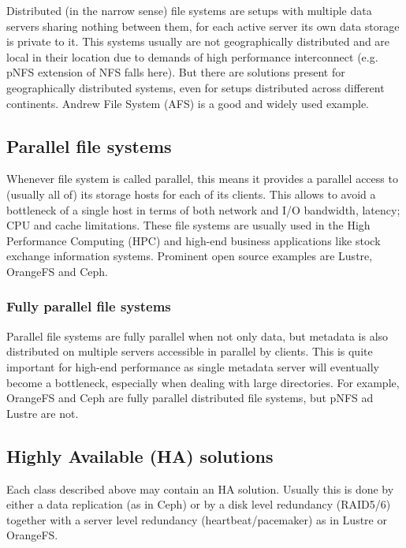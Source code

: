 \documentclass[10pt, a5paper]{article}
\begin{document}
Distributed (in the narrow sense) file systems are setups with multiple data servers sharing nothing between them, for each active server its own data storage is private to it. This systems usually are not geographically distributed and are local in their location due to demands of high performance interconnect (e.g. pNFS\cite{bib3} extension of NFS\cite{bib2} falls here). But there are solutions present for geographically distributed systems, even for setups distributed across different continents. Andrew File System (AFS\cite{bib8}) is a good and widely used example.

\subsection*{Parallel file systems}

Whenever file system is called parallel, this means it provides a parallel access to (usually all of) its storage hosts for each of its clients. This allows to avoid a bottleneck of a single host in terms of both network and I/O bandwidth, latency; CPU and cache limitations. These file systems are usually used in the High Performance Computing (HPC\cite{bib2}\cite{bib9}) and high-end business applications like stock exchange information systems. Prominent open source examples are Lustre\cite{bib10}, OrangeFS\cite{bib11} and Ceph\cite{bib12}.

\subsubsection*{Fully parallel file systems}

Parallel file systems are fully parallel when not only data, but metadata is also distributed on multiple servers accessible in parallel by clients. This is quite important for high-end performance as single metadata server will eventually become a bottleneck, especially when dealing with large directories. For example, OrangeFS\cite{bib11} and Ceph\cite{bib12} are fully parallel distributed file systems, but pNFS\cite{bib4} ad Lustre\cite{bib10} are not.

\subsection*{Highly Available (HA) solutions}

Each class described above may contain an HA solution. Usually this is done by either a data replication (as in Ceph\cite{bib12}) or by a disk level redundancy (RAID5/6) together with a server level redundancy (heartbeat/pacemaker) as in Lustre\cite{bib10} or OrangeFS\cite{bib11}.
\end{document}
